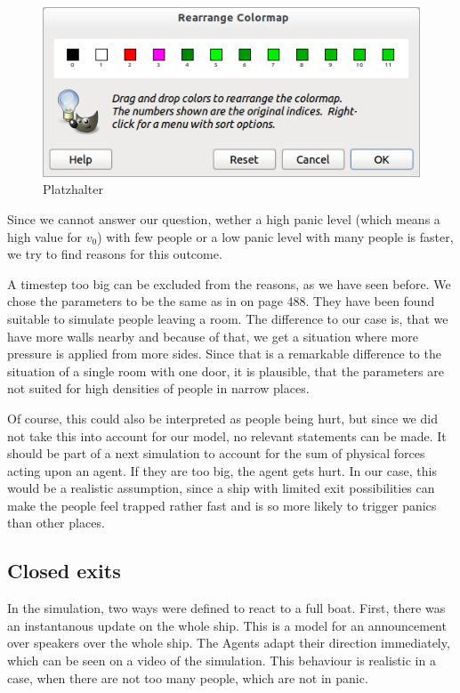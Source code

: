 \documentclass[11pt]{article}
\begin{document}
\begin{figure}[h]
	\centering
	\includegraphics[scale=0.5]{images/gimp.png}
	\caption{Platzhalter}
	\label{stuckinwall}
	
\end{figure}

Since we cannot answer our question, wether a high panic level (which means a high value for \(v_0\))
with few people
or a low panic level with many people is faster, we try to find reasons for this outcome.

A timestep too big can be excluded from the reasons, as we have seen before.
We chose the parameters to be the same as in \cite{helbing} on page 488.
They have been found suitable to simulate people leaving a room.
The difference to our case is, that we have more walls nearby and
because of that, we get a situation where more pressure is applied from more sides. 
Since that is a remarkable difference to the situation of a single room with one door, 
it is plausible, that the parameters are not suited for high densities of people in 
narrow places. 

Of course, this could also be interpreted as people being hurt, but since
we did not take this into account for our model, no relevant statements can
be made. It should be part of a next simulation to account for the sum of 
physical forces acting upon an agent. If they are too big, the agent gets hurt.
In our case, this would be a realistic assumption, since a ship with limited
exit possibilities can make the people feel trapped rather fast and is so more
likely to trigger panics than other places.



\subsection{Closed exits} %
\label{sub:Closed exits}
In the simulation, two ways were defined to react to a full boat. First, there was an instantanous update on the whole ship.
This is a model for an announcement over speakers over the whole ship.
The Agents adapt their direction immediately, which can be seen on a video of the simulation.
This behaviour is realistic in a case, when there are not too many people, which are not in panic.
\end{document}
